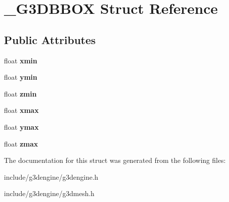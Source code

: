 \hypertarget{struct__G3DBBOX}{}\section{\+\_\+\+G3\+D\+B\+B\+OX Struct Reference}
\label{struct__G3DBBOX}
\subsection*{Public Attributes}
\begin{DoxyCompactItemize}
\item 
\mbox{\label{struct__G3DBBOX_a06da0310ef74271daee302d8ecea414b}} 
float {\bfseries xmin}
\item 
\mbox{\label{struct__G3DBBOX_a3126afee689baf45def8b0163123e5d7}} 
float {\bfseries ymin}
\item 
\mbox{\label{struct__G3DBBOX_af53aab00e7f7a73da4bc7e54fe923d9a}} 
float {\bfseries zmin}
\item 
\mbox{\label{struct__G3DBBOX_a1b738a4f02cf1779a07499cf8719dceb}} 
float {\bfseries xmax}
\item 
\mbox{\label{struct__G3DBBOX_a4bfa9b59915cecdcdf1b4da34b95353c}} 
float {\bfseries ymax}
\item 
\mbox{\label{struct__G3DBBOX_a0277d37fe923571116a77ab2052a5868}} 
float {\bfseries zmax}
\end{DoxyCompactItemize}


The documentation for this struct was generated from the following files\+:\begin{DoxyCompactItemize}
\item 
include/g3dengine/g3dengine.\+h\item 
include/g3dengine/g3dmesh.\+h\end{DoxyCompactItemize}
